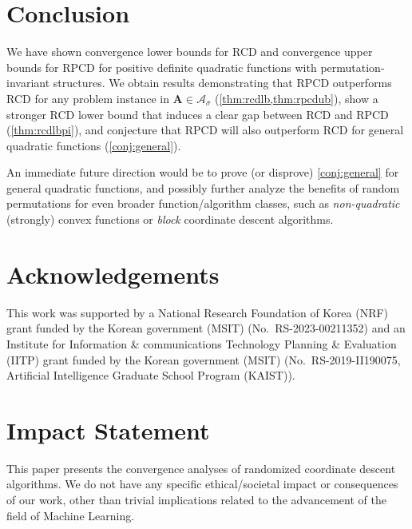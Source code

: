 \documentclass{article}
\theoremstyle{plain}
\theoremstyle{definition}
\theoremstyle{remark}
\def\mA{{\bm{A}}}
\def\gA{{\mathcal{A}}}
\begin{document}
\section{Conclusion}
\label{sec:5}

We have shown convergence lower bounds for RCD and convergence upper bounds for RPCD for positive definite quadratic functions with permutation-invariant structures.
We obtain results demonstrating that RPCD outperforms RCD for any problem instance in $\mA \in \gA_{\sigma}$ (\cref{thm:rcdlb,thm:rpcdub}), show a stronger RCD lower bound that induces a clear gap between RCD and RPCD (\cref{thm:rcdlbpi}), and conjecture that RPCD will also outperform RCD for general quadratic functions (\cref{conj:general}).

An immediate future direction would be to prove (or disprove) \cref{conj:general} for general quadratic functions, and possibly further analyze the benefits of random permutations for even broader function/algorithm classes, such as \emph{non-quadratic} (strongly) convex functions or \emph{block} coordinate descent algorithms.

\section*{Acknowledgements}

This work was supported by a National Research Foundation of Korea (NRF) grant funded by the Korean government (MSIT) (No.\ RS-2023-00211352) and an Institute for Information \& communications Technology Planning \& Evaluation (IITP) grant funded by the Korean government (MSIT) (No.\ RS-2019-II190075, Artificial Intelligence Graduate School Program (KAIST)).

\section*{Impact Statement}
This paper presents the convergence analyses of randomized coordinate descent algorithms.
We do not have any specific ethical/societal impact or consequences of our work, other than trivial implications related to the advancement of the field of Machine Learning.



\end{document}
